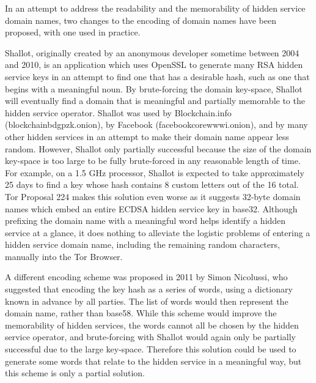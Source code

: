 In an attempt to address the readability and the memorability of hidden service domain names, two changes to the encoding of domain names have been proposed, with one used in practice.

Shallot, originally created by an anonymous developer sometime between 2004 and 2010, is an application which uses OpenSSL to generate many RSA hidden service keys in an attempt to find one that has a desirable hash, such as one that begins with a meaningful noun.\cite{KatmagicShallot} By brute-forcing the domain key-space, Shallot will eventually find a domain that is meaningful and partially memorable to the hidden service operator. Shallot was used by Blockchain.info (blockchainbdgpzk.onion), by Facebook (facebookcorewwwi.onion), and by many other hidden services in an attempt to make their domain name appear less random. However, Shallot only partially successful because the size of the domain key-space is too large to be fully brute-forced in any reasonable length of time. For example, on a 1.5 GHz processor, Shallot is expected to take approximately 25 days to find a key whose hash contains 8 custom letters out of the 16 total.\cite{KatmagicShallot} Tor Proposal 224 makes this solution even worse as it suggests 32-byte domain names which embed an entire ECDSA hidden service key in base32.\cite{Proposal224} Although prefixing the domain name with a meaningful word helps identify a hidden service at a glance, it does nothing to alleviate the logistic problems of entering a hidden service domain name, including the remaining random characters, manually into the Tor Browser.

A different encoding scheme was proposed in 2011 by Simon Nicolussi, who suggested that encoding the key hash as a series of words, using a dictionary known in advance by all parties. The list of words would then represent the domain name, rather than base58. While this scheme would improve the memorability of hidden services, the words cannot all be chosen by the hidden service operator, and brute-forcing with Shallot would again only be partially successful due to the large key-space. Therefore this solution could be used to generate some words that relate to the hidden service in a meaningful way, but this scheme is only a partial solution.\cite{NicolussiThesis2011}


